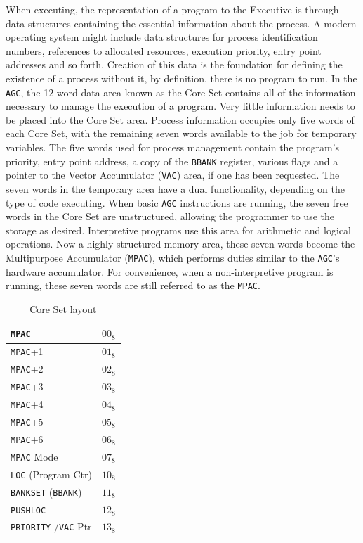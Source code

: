 \documentclass[refcap, oxford]{ahsan}
\begin{document}
When executing, the representation of a program to the Executive is through data structures containing the essential information about the process. A modern operating system might include data structures for process identification numbers, references to allocated resources, execution priority, entry point addresses and so forth. Creation of this data is the foundation for defining the existence of a process without it, by definition, there is no program to run. In the \texttt{AGC}, the 12-word data area known as the Core Set contains all of the information necessary to manage the execution of a program. Very little information needs to be placed into the Core Set area. Process information occupies only five words of each Core Set, with the remaining seven words available to the job for temporary variables. The five words used for process management contain the program's priority, entry point address, a copy of the \texttt{BBANK} register, various flags and a pointer to the Vector Accumulator (\texttt{VAC}) area, if one has been requested. The seven words in the temporary area have a dual functionality, depending on the type of code executing. When basic \texttt{AGC} instructions are running, the seven free words in the Core Set are unstructured, allowing the programmer to use the storage as desired. Interpretive programs use this area for arithmetic and logical operations. Now a highly structured memory area, these seven words become the Multipurpose Accumulator (\texttt{MPAC}), which performs duties similar to the \texttt{AGC}'s hardware accumulator. For convenience, when a non-interpretive program is running, these seven words are still referred to as the \texttt{MPAC}.

\begin{table}[H]
    \centering
    \begin{tabular}{|ll|}
        \hline
        \texttt{MPAC} & $00_{8}$ \\
        \hline
        \texttt{MPAC}+1 & $01_{8}$ \\
        \hline
        \texttt{MPAC}+2 & $02_{8}$ \\
        \hline
        \texttt{MPAC}+3 & $03_{8}$ \\
        \hline
        \texttt{MPAC}+4 & $04_{8}$ \\
        \hline
        \texttt{MPAC}+5 & $05_{8}$ \\
        \hline
        \texttt{MPAC}+6 & $06_{8}$ \\
        \hline
        \texttt{MPAC} Mode & $07_{8}$ \\
        \hline
        \texttt{LOC} (Program Ctr) & $10_{8}$ \\
        \hline
        \texttt{BANKSET} (\texttt{BBANK}) & $11_{8}$ \\
        \hline
        \texttt{PUSHLOC} & $12_{8}$ \\
        \hline
        \texttt{PRIORITY} /\texttt{VAC} Ptr & $13_{8}$ \\
        \hline
    \end{tabular}
    \caption{Core Set layout}
\end{table}
\end{document}
